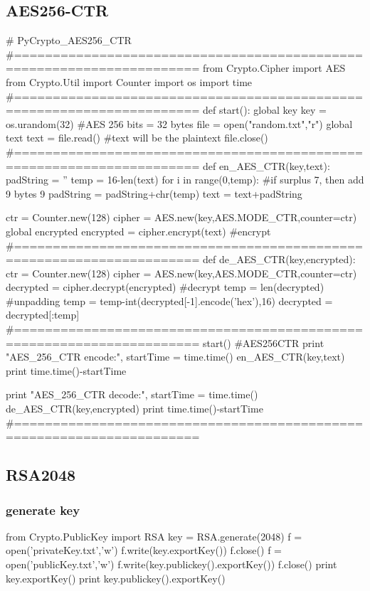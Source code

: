 \documentclass{article}
\begin{document}
\subsection{AES256-CTR}
\begin{python}
# PyCrypto_AES256_CTR
#======================================================================
from Crypto.Cipher import AES
from Crypto.Util import Counter
import os
import time
#======================================================================
def start():
    global key
    key = os.urandom(32)                    #AES 256 bits = 32 bytes
    file = open("random.txt","r")
    global text 
    text = file.read()                      #text will be the plaintext
    file.close()
#======================================================================
def en_AES_CTR(key,text):
    padString = ''
    temp = 16-len(text)%
    for i in range(0,temp):           #if surplus 7, then add 9 bytes 9
        padString = padString+chr(temp)
    text = text+padString

    ctr = Counter.new(128)
    cipher = AES.new(key,AES.MODE_CTR,counter=ctr)
    global encrypted 
    encrypted = cipher.encrypt(text)                           #encrypt
#======================================================================
def de_AES_CTR(key,encrypted):
    ctr = Counter.new(128)
    cipher = AES.new(key,AES.MODE_CTR,counter=ctr)
    decrypted = cipher.decrypt(encrypted)                      #decrypt
    temp = len(decrypted)                                    #unpadding
    temp = temp-int(decrypted[-1].encode('hex'),16)
    decrypted = decrypted[:temp]
#======================================================================
start()
#AES256CTR
print "AES_256_CTR encode:",
startTime = time.time()
en_AES_CTR(key,text)
print time.time()-startTime

print "AES_256_CTR decode:",
startTime = time.time()
de_AES_CTR(key,encrypted)
print time.time()-startTime
#======================================================================
\end{python}
\newpage
\subsection{RSA2048}
\subsubsection{generate key}
\begin{python}
from Crypto.PublicKey import RSA
key = RSA.generate(2048)
f = open('privateKey.txt','w')
f.write(key.exportKey())
f.close()
f = open('publicKey.txt','w')
f.write(key.publickey().exportKey())
f.close()
print key.exportKey()
print key.publickey().exportKey()
\end{python}
\end{document}
